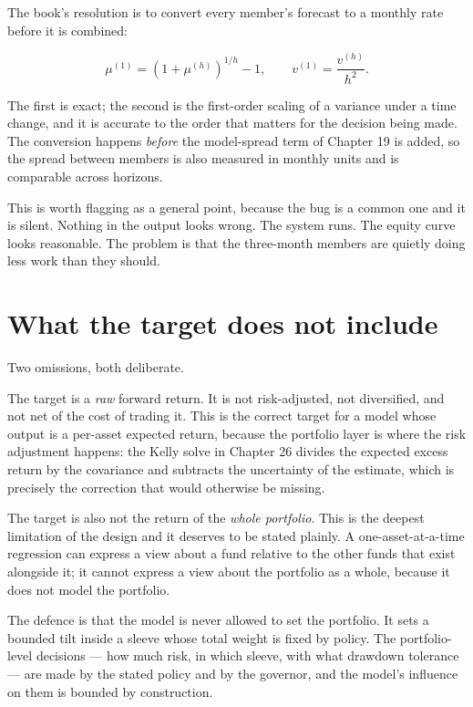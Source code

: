 The book's resolution is to convert every member's forecast to a monthly
rate before it is combined:

\[
\mu^{(1)} = \left(1+\mu^{(h)}\right)^{1/h} - 1,
\qquad
v^{(1)} = \frac{v^{(h)}}{h^{2}}.
\]

The first is exact; the second is the first-order scaling of a variance
under a time change, and it is accurate to the order that matters for the
decision being made. The conversion happens \emph{before} the model-spread
term of Chapter 19 is added, so the spread between members is also
measured in monthly units and is comparable across horizons.

This is worth flagging as a general point, because the bug is a common
one and it is silent. Nothing in the output looks wrong. The system runs.
The equity curve looks reasonable. The problem is that the three-month
members are quietly doing less work than they should.

\section{What the target does not include}

Two omissions, both deliberate.

The target is a \emph{raw} forward return. It is not risk-adjusted, not
diversified, and not net of the cost of trading it. This is the correct
target for a model whose output is a per-asset expected return, because
the portfolio layer is where the risk adjustment happens: the Kelly solve
in Chapter 26 divides the expected excess return by the covariance and
subtracts the uncertainty of the estimate, which is precisely the
correction that would otherwise be missing.

The target is also not the return of the \emph{whole portfolio}. This is
the deepest limitation of the design and it deserves to be stated plainly.
A one-asset-at-a-time regression can express a view about a fund relative
to the other funds that exist alongside it; it cannot express a view about
the portfolio as a whole, because it does not model the portfolio.

The defence is that the model is never allowed to set the portfolio. It
sets a bounded tilt inside a sleeve whose total weight is fixed by
policy. The portfolio-level decisions --- how much risk, in which sleeve,
with what drawdown tolerance --- are made by the stated policy and by the
governor, and the model's influence on them is bounded by construction.

